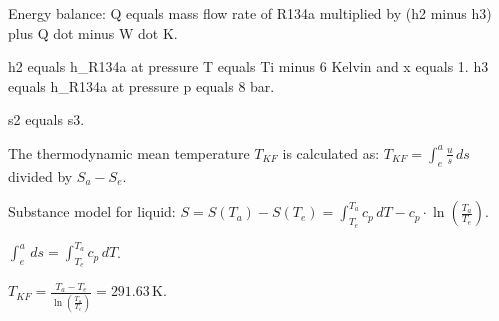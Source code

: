 Energy balance:  
Q equals mass flow rate of R134a multiplied by (h2 minus h3) plus Q dot minus W dot K.  

h2 equals h_R134a at pressure T equals Ti minus 6 Kelvin and x equals 1.  
h3 equals h_R134a at pressure p equals 8 bar.  

s2 equals s3.

The thermodynamic mean temperature \( T_{KF} \) is calculated as:  
\( T_{KF} = \int_{e}^{a} \frac{u}{s} \, ds \) divided by \( S_{a} - S_{e} \).  

Substance model for liquid:  
\( S = S(T_a) - S(T_e) = \int_{T_e}^{T_a} c_{p} \, dT - c_{p} \cdot \ln \left( \frac{T_a}{T_e} \right) \).  

\( \int_{e}^{a} \, ds = \int_{T_e}^{T_a} c_{p} \, dT \).  

\( T_{KF} = \frac{T_a - T_e}{\ln \left( \frac{T_a}{T_e} \right)} = 291.63 \, \text{K} \).